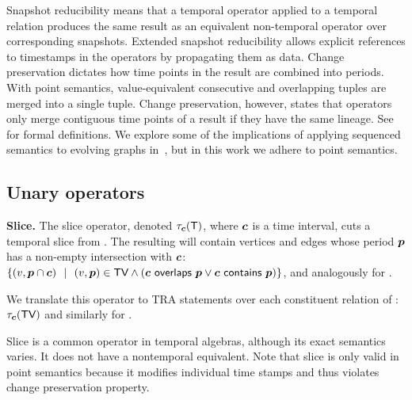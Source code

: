 Snapshot reducibility means that a temporal operator applied to a
temporal relation produces the same result as an equivalent
non-temporal operator over corresponding snapshots.  Extended snapshot
reducibility allows explicit references to timestamps in the operators
by propagating them as data.  Change preservation dictates how time
points in the result are combined into periods.  With point semantics,
value-equivalent consecutive and overlapping tuples are merged into a
single tuple.  Change preservation, however, states that operators
only merge contiguous time points of a result if they have the same
lineage.  See~\cite{Dignos2012} for formal definitions.  We explore
some of the implications of applying sequenced semantics to evolving
graphs in~\cite{MoffittEDBT2017}, but in this work we adhere to point
semantics.


\subsection{Unary operators}
\label{sec:algebra:unary}

{\bf Slice.} The slice operator, denoted $\tau_{\boldsymbol{c}}(\mathsf{T})$, where
$\boldsymbol{c}$ is a time interval, cuts a temporal slice from \ttt. The
resulting \tg will contain vertices and edges whose period $\boldsymbol{p}$ has a
non-empty intersection with $\boldsymbol{c}$: $\{ (v, \boldsymbol{p} \cap \boldsymbol{c})~~|~~(v, \boldsymbol{p}) \in \textsf{TV}
\wedge (\boldsymbol{c}~\mathsf{overlaps}~\boldsymbol{p} \vee \boldsymbol{c}~\mathsf{contains}~\boldsymbol{p})
\}$, and analogously for \te.

We translate this \tga operator to TRA statements over each
constituent relation of \tve: $\tau_{\boldsymbol{c}}(\textsf{TV})$ and similarly for
\te.

Slice is a common operator in temporal algebras, although its exact
semantics varies.  It does not have a nontemporal equivalent.  Note
that slice is only valid in point semantics because it modifies
individual time stamps and thus violates change preservation property.


